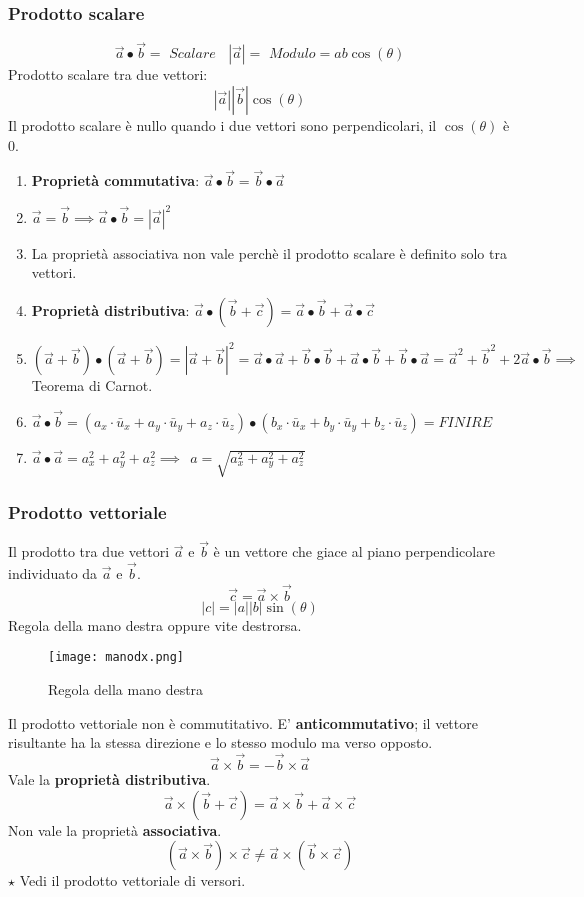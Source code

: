 \documentclass[../../main.tex]{subfiles}
\begin{document}
\subsubsection{Prodotto scalare}
\[
    \vec{a} \bullet \vec{b} = \textit{ Scalare} \ \ \ \ |\vec{a}| = \textit{ Modulo} = ab \cos(\theta)
\]
Prodotto scalare tra due vettori:
\[
    |\vec{a}||\vec{b}| \cos(\theta)
\]
Il prodotto scalare è nullo quando i due vettori sono perpendicolari, il $\cos(\theta)$ è $0$.
\begin{enumerate}
    \item \textbf{Proprietà commutativa}: $\vec{a} \bullet \vec{b} = \vec{b} \bullet \vec{a}$
    \item $\vec{a} = \vec{b} \implies \vec{a} \bullet \vec{b} = |\vec{a}|^2$
    \item La proprietà associativa non vale perchè il prodotto scalare è definito solo tra vettori.
    \item \textbf{Proprietà distributiva}: $\vec{a} \bullet (\vec{b} + \vec{c}) = \vec{a} \bullet \vec{b} + \vec{a} \bullet \vec{c}$
    \item $(\vec{a} + \vec{b}) \bullet (\vec{a} + \vec{b}) = |\vec{a} + \vec{b}|^2 = \vec{a} \bullet \vec{a} + \vec{b} \bullet \vec{b} + \vec{a} \bullet \vec{b} + \vec{b} \bullet \vec{a} = \vec{a}^2 + \vec{b}^2 + 2\vec{a} \bullet \vec{b} \implies$ Teorema di Carnot.
    \item $\vec{a} \bullet \vec{b} = (a_x \cdot \bar{u}_x + a_y \cdot \bar{u}_y + a_z \cdot \bar{u}_z) \bullet (b_x \cdot \bar{u}_x + b_y \cdot \bar{u}_y + b_z \cdot \bar{u}_z) = FINIRE$
    \item $\vec{a} \bullet \vec{a} = a_x^2 + a_y^2 + a_z^2 \implies \ \ a = \sqrt{a_x^2 + a_y^2 + a_z^2}$
\end{enumerate}
\subsubsection{Prodotto vettoriale}
Il prodotto tra due vettori $\vec{a}$ e $\vec{b}$ è un vettore che giace al piano perpendicolare individuato da $\vec{a}$ e $\vec{b}$.
\[
    \vec{c} = \vec{a} \times \vec{b}
\]
\[
    |c| = |a||b| \sin(\theta)
\]
Regola della mano destra oppure vite destrorsa.
\begin{figure}[h!]
    \centering
    \texttt{[image: manodx.png]}
    \caption{Regola della mano destra}
\end{figure}

Il prodotto vettoriale non è commutitativo. E' \textbf{anticommutativo}; il vettore risultante ha la stessa direzione e lo stesso modulo ma verso opposto.
\[
    \vec{a} \times \vec{b} = - \vec{b} \times \vec{a}
\]
Vale la \textbf{proprietà distributiva}.
\[
    \vec{a} \times (\vec{b} + \vec{c}) = \vec{a} \times \vec{b} + \vec{a} \times \vec{c}
\]
Non vale la proprietà \textbf{associativa}.
\[
    (\vec{a}\times\vec{b})\times\vec{c} \neq \vec{a}\times(\vec{b}\times\vec{c})
\]
$\star$ Vedi il prodotto vettoriale di versori.
\end{document}
